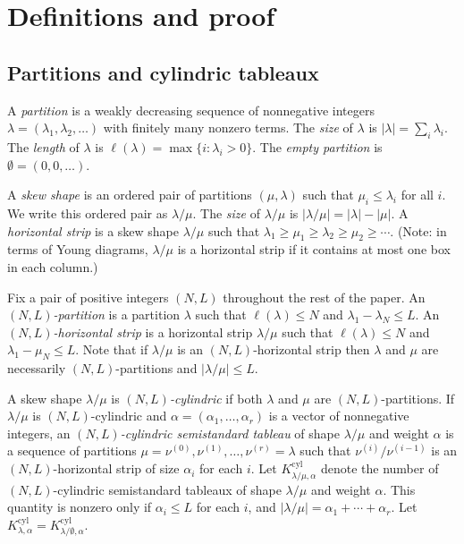 \documentclass[a4paper,11pt,twoside]{amsart}
\newcommand{\cyl}{\mathrm{cyl}}
\begin{document}
\section{Definitions and proof}
\subsection{Partitions and cylindric tableaux}
A \emph{partition} is a weakly decreasing sequence of nonnegative integers $\lambda = (\lambda_1, \lambda_2, \ldots)$ with finitely many nonzero terms. The \emph{size} of $\lambda$ is $|\lambda| = \sum_i \lambda_i$. The \emph{length} of $\lambda$ is $\ell(\lambda) = \max\{i : \lambda_i > 0\}$. The \emph{empty partition} is $\emptyset = (0,0,\ldots)$.

A \emph{skew shape} is an ordered pair of partitions $(\mu,\lambda)$ such that $\mu_i \leq \lambda_i$ for all $i$. We write this ordered pair as $\lambda/\mu$. The \emph{size} of $\lambda/\mu$ is $|\lambda/\mu| = |\lambda| - |\mu|$. A \emph{horizontal strip} is a skew shape $\lambda/\mu$ such that $\lambda_1 \geq \mu_1 \geq \lambda_2 \geq \mu_2 \geq \cdots$. (Note: in terms of Young diagrams, $\lambda/\mu$ is a horizontal strip if it contains at most one box in each column.)

Fix a pair of positive integers $(N,L)$ throughout the rest of the paper. An \emph{$(N,L)$-partition} is a partition $\lambda$ such that $\ell(\lambda) \leq N$ and $\lambda_1-\lambda_N \leq L$. An \emph{$(N,L)$-horizontal strip} is a horizontal strip $\lambda/\mu$ such that $\ell(\lambda) \leq N$ and $\lambda_1-\mu_N \leq L$. Note that if $\lambda/\mu$ is an $(N,L)$-horizontal strip then $\lambda$ and $\mu$ are necessarily $(N,L)$-partitions and $|\lambda/\mu| \leq L$.

A skew shape $\lambda/\mu$ is \emph{$(N,L)$-cylindric} if both $\lambda$ and $\mu$ are $(N,L)$-partitions. If $\lambda/\mu$ is $(N,L)$-cylindric and $\alpha=(\alpha_1,\ldots,\alpha_r)$ is a vector of nonnegative integers, an \emph{$(N,L)$-cylindric semistandard tableau} of shape $\lambda/\mu$ and weight $\alpha$ is a sequence of partitions $\mu = \nu^{(0)}, \nu^{(1)}, \ldots, \nu^{(r)} = \lambda$ such that $\nu^{(i)}/\nu^{(i-1)}$ is an $(N,L)$-horizontal strip of size $\alpha_i$ for each $i$. Let $K^\cyl_{\lambda/\mu,\alpha}$ denote the number of $(N,L)$-cylindric semistandard tableaux of shape $\lambda/\mu$ and weight $\alpha$. This quantity is nonzero only if $\alpha_i \leq L$ for each $i$, and $|\lambda/\mu| = \alpha_1+\cdots+\alpha_r$. Let $K^\cyl_{\lambda,\alpha} = K^\cyl_{\lambda/\emptyset,\alpha}$.
\end{document}
